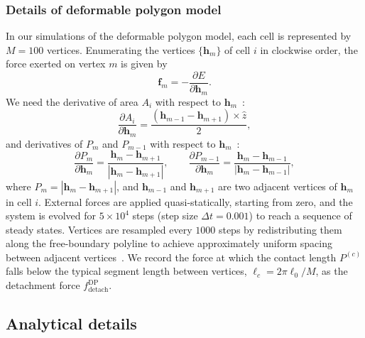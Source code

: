 \subsubsection{Details of deformable polygon model}
\label{sec:ch4:DP-details}

In our simulations of the deformable polygon model, each cell is represented by $M=100$ vertices. Enumerating the vertices $\{\mathbf{h}_m\}$ of cell $i$ in clockwise order, the force exerted on vertex $m$ is given by
\begin{equation}
    \mathbf{f}_m=-\frac{\partial E}{\partial \mathbf{h}_m}.
\end{equation}
We need the derivative of area $A_i$ with respect to $\mathbf{h}_m$~\cite{teomy2018confluent}:
\begin{equation}
    \frac{\partial A_i}{\partial\mathbf{h}_m}=\frac{(\mathbf{h}_{m-1}-\mathbf{h}_{m+1})\times\hat{z}}{2},
\end{equation}
and derivatives of $P_m$ and $P_{m-1}$ with respect to $\mathbf{h}_m$~\cite{teomy2018confluent}:
\begin{equation}
    \frac{\partial P_m}{\partial \mathbf{h}_m}=\frac{\mathbf{h}_m-\mathbf{h}_{m+1}}{|\mathbf{h}_m-\mathbf{h}_{m+1}|},\qquad\frac{\partial P_{m-1}}{\partial \mathbf{h}_m}=\frac{\mathbf{h}_m-\mathbf{h}_{m-1}}{|\mathbf{h}_m-\mathbf{h}_{m-1}|},
\end{equation}
where $P_{m}=|\mathbf{h}_m-\mathbf{h}_{m+1}|$, and $\mathbf{h}_{m-1}$ and $\mathbf{h}_{m+1}$ are two adjacent vertices of $\mathbf{h}_m$ in cell $i$.
External forces are applied quasi-statically, starting from zero, and the system is evolved for $5\times10^4$ steps (step size $\Delta t=0.001$) to reach a sequence of steady states.
Vertices are resampled every $1000$ steps by redistributing them along the free-boundary polyline to achieve approximately uniform spacing between adjacent vertices~\cite{weng2022convergent}.
We record the force at which the contact length $P^{(c)}$ falls below the typical segment length between vertices, $\ell_c =2\pi\ell_0/M$, as the detachment force $f_\textrm{detach}^\textrm{DP}$.


\subsection{Analytical details}

